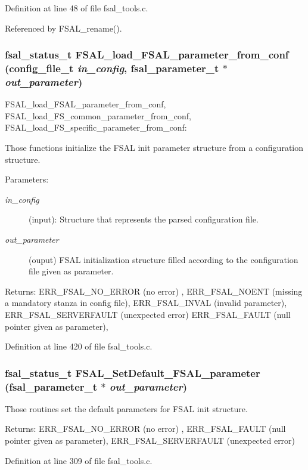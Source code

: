 Definition at line 48 of file fsal\_\-tools.c.

Referenced by FSAL\_\-rename().
\subsubsection{\setlength{\rightskip}{0pt plus 5cm}fsal\_\-status\_\-t FSAL\_\-load\_\-FSAL\_\-parameter\_\-from\_\-conf (config\_\-file\_\-t {\em in\_\-config}, fsal\_\-parameter\_\-t $\ast$ {\em out\_\-parameter})}\label{fsal__tools_8c_a11}


FSAL\_\-load\_\-FSAL\_\-parameter\_\-from\_\-conf, FSAL\_\-load\_\-FS\_\-common\_\-parameter\_\-from\_\-conf, FSAL\_\-load\_\-FS\_\-specific\_\-parameter\_\-from\_\-conf:

Those functions initialize the FSAL init parameter structure from a configuration structure.

\begin{Desc}
\item[Parameters:]
\begin{description}
\item[{\em in\_\-config}](input): Structure that represents the parsed configuration file. \item[{\em out\_\-parameter}](ouput) FSAL initialization structure filled according to the configuration file given as parameter.\end{description}
\end{Desc}
\begin{Desc}
\item[Returns:]ERR\_\-FSAL\_\-NO\_\-ERROR (no error) , ERR\_\-FSAL\_\-NOENT (missing a mandatory stanza in config file), ERR\_\-FSAL\_\-INVAL (invalid parameter), ERR\_\-FSAL\_\-SERVERFAULT (unexpected error) ERR\_\-FSAL\_\-FAULT (null pointer given as parameter), \end{Desc}


Definition at line 420 of file fsal\_\-tools.c.
\subsubsection{\setlength{\rightskip}{0pt plus 5cm}fsal\_\-status\_\-t FSAL\_\-Set\-Default\_\-FSAL\_\-parameter (fsal\_\-parameter\_\-t $\ast$ {\em out\_\-parameter})}\label{fsal__tools_8c_a8}


Those routines set the default parameters for FSAL init structure. \begin{Desc}
\item[Returns:]ERR\_\-FSAL\_\-NO\_\-ERROR (no error) , ERR\_\-FSAL\_\-FAULT (null pointer given as parameter), ERR\_\-FSAL\_\-SERVERFAULT (unexpected error) \end{Desc}


Definition at line 309 of file fsal\_\-tools.c.
